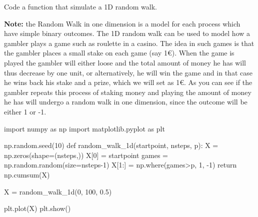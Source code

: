 \documentclass[12pt,a4paper]{book}
\begin{document}
\begin{exercise}[subtitle={1D Random Walk (\texttt{python})}, label={ex:2.2}]
Code a function that simulate a 1D random walk. 

\textbf{Note: } the Random Walk in one dimension is a model for each process which have simple binary outcomes.
The 1D random walk can be used to model how a gambler plays a game such as roulette in a casino. The idea in such games is that the gambler places a small stake on each game (say 1€). When the game is played the gambler will either loose and the total amount of money he has will thus decrease by one unit, or alternatively, he will win the game and in that case he wins back his stake and a prize, which we will set as 1€. As you can see if the gambler repeats this process of staking money and playing the amount of money he has will undergo a random walk in one dimension, since the outcome will be either 1 or -1.
\end{exercise}

\begin{solution}
\begin{ipython}
import numpy as np
import matplotlib.pyplot as plt

np.random.seed(10)
def random_walk_1d(startpoint, nsteps, p):
    X = np.zeros(shape=(nsteps,))
    X[0] = startpoint
    games = np.random.random(size=nsteps-1)
    X[1:] = np.where(games>p, 1, -1)
    return np.cumsum(X)

X = random_walk_1d(0, 100, 0.5)

plt.plot(X)
plt.show()
\end{ipython}
\end{solution}
\end{document}
